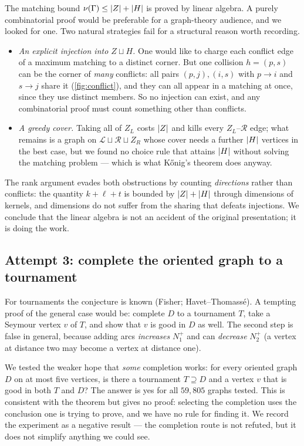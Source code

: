 The matching bound $\nu(\Gamma)\le\lvert Z\rvert+\lvert H\rvert$ is proved by linear algebra. A purely combinatorial
proof would be preferable for a graph-theory audience, and we looked for one. Two natural strategies
fail for a structural reason worth recording.
\begin{itemize}[leftmargin=1.4em,itemsep=2pt,topsep=1pt]
\item \emph{An explicit injection into $Z\sqcup H$.} One would like to charge each conflict edge of a
 maximum matching to a distinct corner. But one collision $h=(p,s)$ can be the corner of \emph{many}
 conflicts: all pairs $(p,j),(i,s)$ with $p\to i$ and $s\to j$ share it (\cref{fig:conflict}), and
 they can all appear in a matching at once, since they use distinct members. So no injection can
 exist, and any combinatorial proof must count something other than conflicts.
\item \emph{A greedy cover.} Taking all of $Z_L$ costs $\lvert Z\rvert$ and kills every $Z_L$--$\mathcal R$
 edge; what remains is a graph on $\mathcal L\sqcup\mathcal R\sqcup Z_R$ whose cover needs a further
 $\lvert H\rvert$ vertices in the best case, but we found no choice rule that attains $\lvert H\rvert$ without
 solving the matching problem --- which is what K\H{o}nig's theorem does anyway.
\end{itemize}
The rank argument evades both obstructions by counting \emph{directions} rather than conflicts: the
quantity $k+\ell+t$ is bounded by $\lvert Z\rvert+\lvert H\rvert$ through dimensions of kernels, and dimensions do not
suffer from the sharing that defeats injections. We conclude that the linear algebra is not an
accident of the original presentation; it is doing the work.

\subsection*{Attempt 3: complete the oriented graph to a tournament}

For tournaments the conjecture is known (Fisher; Havet--Thomass\'e). A tempting proof of the general
case would be: complete $D$ to a tournament $T$, take a Seymour vertex $v$ of $T$, and show that $v$
is good in $D$ as well. The second step is false in general, because adding arcs \emph{increases}
$N_1^+$ and can \emph{decrease} $N_2^+$ (a vertex at distance two may become a vertex at distance
one).

We tested the weaker hope that \emph{some} completion works: for every oriented graph $D$ on at most
five vertices, is there a tournament $T\supseteq D$ and a vertex $v$ that is good in both $T$ and $D$?
The answer is yes for all $59{,}805$ graphs tested. This is consistent with the theorem but gives no
proof: selecting the completion uses the conclusion one is trying to prove, and we have no rule for
finding it. We record the experiment as a negative result --- the completion route is not refuted, but
it does not simplify anything we could see.


